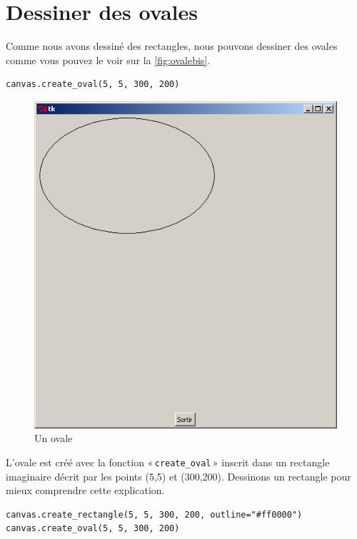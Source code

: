 \section{Dessiner des ovales}
Comme nous avons dessiné des rectangles, nous pouvons dessiner des ovales comme vous pouvez le voir sur la \autoref{fig:ovalebis}.

\begin{Verbatim}[frame=single,rulecolor=\color{mbleu}, label=à taper]
canvas.create_oval(5, 5, 300, 200)
\end{Verbatim}

\begin{figure}[h!]
\centering
\includegraphics[scale=0.4]{images/ovalebis}
\caption{Un ovale}\label{fig:ovalebis}
\end{figure}

L'ovale est créé avec la fonction « \texttt{create\_oval} » inscrit dans un rectangle imaginaire décrit par les points (5,5) et (300,200). Dessinons un rectangle pour mieux comprendre cette explication.

\begin{Verbatim}[frame=single,rulecolor=\color{mbleu}, label=à taper]
canvas.create_rectangle(5, 5, 300, 200, outline="#ff0000")
canvas.create_oval(5, 5, 300, 200)
\end{Verbatim}

